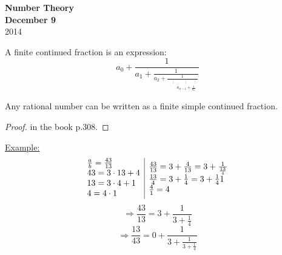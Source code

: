 \documentclass{report}
\begin{document}
{\centering
\Large
\textbf{Number Theory}\\
\normalsize
\textbf{December 9}\\
2014\\
}
\vspace{10mm}
\begin{defi} A finite continued fraction is an expression: \[a_0+\frac{1}{a_1+\frac{1}{a_2+\frac{1}{\begin{array}{lcl}
																																																		&\scriptstyle{\vdots}&\scriptstyle{\qquad \vdots \qquad \vdots}\\
																																																		&&\scriptstyle{a_{n-1}+\frac{1}{a_n}}
																																																		\end{array}}}}\]
\end{defi}
\begin{thm} Any rational number can be written as a finite simple continued fraction.\end{thm}
\begin{proof} in the book p.308. \end{proof}

\underline{Example:} \[\begin{array}{lcl}
												\frac{a}{b} = \frac{43}{13}\\
												43=3\cdot 13 +4\\
												13=3\cdot 4+1\\
												4=4\cdot 1
												\end{array}
												\vline
												\begin{array}{lcl}
												\frac{43}{13} = 3+\frac{4}{13}=3+\frac{1}{\frac{13}{4}}\\
												\frac{13}{4}=3+\frac{1}{4}=3+\frac{1}{4}{1}\\
												\frac{4}{1}=4
												\end{array}
												\]
												\[\Rightarrow \frac{43}{13}=3+\frac{1}{3+\frac{1}{4}}\]
												\[\Rightarrow \frac{13}{43}=0+\frac{1}{3+\frac{1}{3+\frac{1}{4}}}\]
												
												
												
\end{document}
